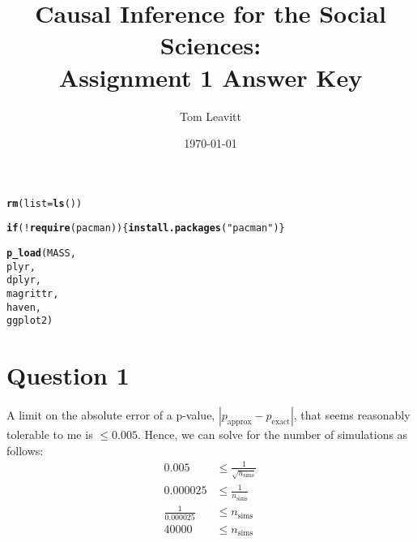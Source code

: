 \documentclass[11pt]{article}\usepackage[]{graphicx}\usepackage[]{color}
\makeatletter
\newcommand{\hlstr}[1]{\textcolor[rgb]{0.192,0.494,0.8}{#1}}%
\newcommand{\hlopt}[1]{\textcolor[rgb]{0,0,0}{#1}}%
\newcommand{\hlstd}[1]{\textcolor[rgb]{0.345,0.345,0.345}{#1}}%
\newcommand{\hlkwa}[1]{\textcolor[rgb]{0.161,0.373,0.58}{\textbf{#1}}}%
\newcommand{\hlkwc}[1]{\textcolor[rgb]{0.333,0.667,0.333}{#1}}%
\newcommand{\hlkwd}[1]{\textcolor[rgb]{0.737,0.353,0.396}{\textbf{#1}}}%
\newenvironment{kframe}{%
 \def\at@end@of@kframe{}%
 \ifinner\ifhmode%
  \def\at@end@of@kframe{\end{minipage}}%
  \begin{minipage}{\columnwidth}%
 \fi\fi%
 \def\FrameCommand##1{\hskip\@totalleftmargin \hskip-\fboxsep
 \colorbox{shadecolor}{##1}\hskip-\fboxsep
     \hskip-\linewidth \hskip-\@totalleftmargin \hskip\columnwidth}%
 \MakeFramed {\advance\hsize-\width
   \@totalleftmargin\z@ \linewidth\hsize
   \@setminipage}}%
 {\par\unskip\endMakeFramed%
 \at@end@of@kframe}
\newenvironment{knitrout}{}{} %
\theoremstyle{newstyle}
\makeatother
\begin{document}
\begin{titlepage}
\title{Causal Inference for the Social Sciences: \\
Assignment 1 Answer Key}
\author{Tom Leavitt}
\date{\today}
\maketitle

\end{titlepage}
\tableofcontents
\clearpage

\doublespacing

\maketitle

\begin{knitrout}
\color{fgcolor}\begin{kframe}
\begin{alltt}
\hlkwd{rm}\hlstd{(}\hlkwc{list}\hlstd{=}\hlkwd{ls}\hlstd{())}

\hlkwa{if}\hlstd{(}\hlopt{!}\hlkwd{require}\hlstd{(pacman)) \{}\hlkwd{install.packages}\hlstd{(}\hlstr{"pacman"}\hlstd{)\}}
\end{alltt}


{\ttfamily\noindent\itshape\color{messagecolor}{\#\# Loading required package: pacman}}

{\ttfamily\noindent\color{warningcolor}{\#\# Warning: package 'pacman' was built under R version 3.3.2}}\begin{alltt}
\hlkwd{p_load}\hlstd{(MASS,}
       \hlstd{plyr,}
       \hlstd{dplyr,}
       \hlstd{magrittr,}
       \hlstd{haven,}
       \hlstd{ggplot2)}
\end{alltt}
\end{kframe}
\end{knitrout}

\section{Question 1}

A limit on the absolute error of a p-value, $\left|p_{\text{approx}} - p_{\text{exact}}\right|$, that seems reasonably tolerable to me is $\leq 0.005$. Hence, we can solve for the number of simulations as follows:
\begin{align*}
0.005 & \leq \frac{1}{\sqrt{n_{\text{sims}}}} \\
0.000025 & \leq \frac{1}{n_{\text{sims}}} \\
\frac{1}{0.000025} & \leq n_{\text{sims}} \\
40000 & \leq n_{\text{sims}}
\end{align*}
\end{document}
